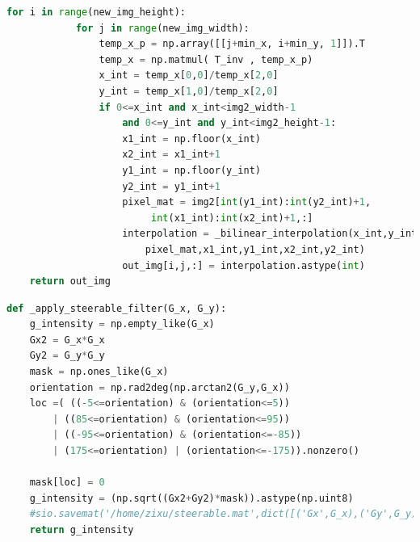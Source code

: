 \documentclass[12pt]{article}
\begin{document}
\begin{lstlisting}[language=python]
		for i in range(new_img_height):
			for j in range(new_img_width):
				temp_x_p = np.array([[j+min_x, i+min_y, 1]]).T
				temp_x = np.matmul( T_inv , temp_x_p)
				x_int = temp_x[0,0]/temp_x[2,0]
				y_int = temp_x[1,0]/temp_x[2,0]
				if 0<=x_int and x_int<img2_width-1 
					and 0<=y_int and y_int<img2_height-1:
					x1_int = np.floor(x_int)
					x2_int = x1_int+1
					y1_int = np.floor(y_int)
					y2_int = y1_int+1
					pixel_mat = img2[int(y1_int):int(y2_int)+1,
						 int(x1_int):int(x2_int)+1,:]
					interpolation = _bilinear_interpolation(x_int,y_int,
						pixel_mat,x1_int,y1_int,x2_int,y2_int)
					out_img[i,j,:] = interpolation.astype(int)
	return out_img
\end{lstlisting}
\vspace{3em}
\begin{lstlisting}[language=python]
def _apply_steerable_filter(G_x, G_y):
	g_intensity = np.empty_like(G_x)
	Gx2 = G_x*G_x
	Gy2 = G_y*G_y
	mask = np.ones_like(G_x)
	orientation = np.rad2deg(np.arctan2(G_y,G_x))
	loc =( ((-5<=orientation) & (orientation<=5)) 
		| ((85<=orientation) & (orientation<=95)) 
		| ((-95<=orientation) & (orientation<=-85)) 
		| (175<=orientation) | (orientation<=-175)).nonzero() 
	
	mask[loc] = 0
	g_intensity = (np.sqrt((Gx2+Gy2)*mask)).astype(np.uint8)
	#sio.savemat('/home/zixu/steerable.mat',dict([('Gx',G_x),('Gy',G_y),('g_intensity',g_intensity),('orientation',orientation)]))
	return g_intensity
\end{lstlisting}
\end{document}
